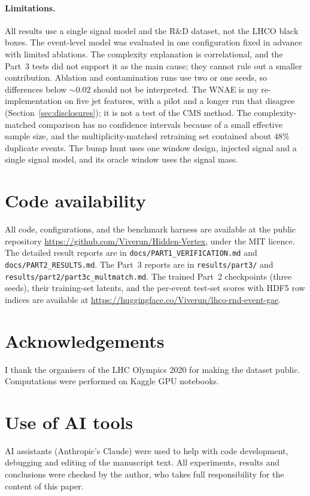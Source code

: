 \documentclass[11pt,a4paper]{article}
\begin{document}
\paragraph{Limitations.}
All results use a single signal model and the R\&D dataset, not the LHCO black boxes. The
event-level model was evaluated in one configuration fixed in advance with limited ablations.
The complexity explanation is correlational, and the Part~3 tests did not support it as the main
cause; they cannot rule out a smaller contribution. Ablation and contamination runs use two or
one seeds, so differences below $\sim0.02$ should not be interpreted. The WNAE is my
re-implementation on five jet features, with a pilot and a longer run that disagree
(Section~\ref{sec:disclosures}); it is not a test of the CMS method. The complexity-matched
comparison has no confidence intervals because of a small effective sample size, and the
multiplicity-matched retraining set contained about $48\%$ duplicate events. The bump hunt uses one
window design, injected signal and a single signal model, and its oracle window uses the signal mass.

\section*{Code availability}
All code, configurations, and the benchmark harness are available at the public repository
\url{https://github.com/Viverun/Hidden-Vertex}, under the MIT licence. The detailed result
reports are in \texttt{docs/PART1\_VERIFICATION.md} and \texttt{docs/PART2\_RESULTS.md}. The Part~3
reports are in \texttt{results/part3/} and \texttt{results/part2/part3c\_multmatch.md}.
The trained Part~2 checkpoints (three seeds), their training-set latents, and the per-event
test-set scores with HDF5 row indices are available at
\url{https://huggingface.co/Viverun/lhco-rnd-event-gae}.

\section*{Acknowledgements}
I thank the organisers of the LHC Olympics 2020 for making the dataset public. Computations
were performed on Kaggle GPU notebooks.

\section*{Use of AI tools}
AI assistants (Anthropic's Claude) were used to help with code development, debugging and
editing of the manuscript text. All experiments, results and conclusions were checked by the
author, who takes full responsibility for the content of this paper.



\end{document}
